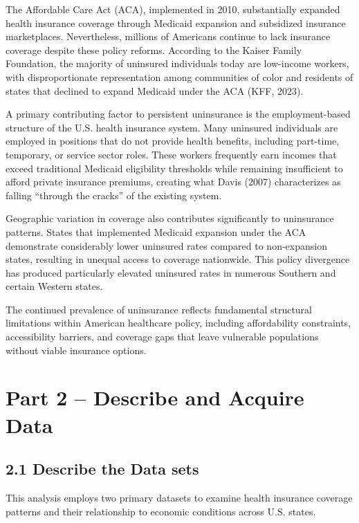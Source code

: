 \documentclass[
]{article}
\begin{document}
The Affordable Care Act (ACA), implemented in 2010, substantially
expanded health insurance coverage through Medicaid expansion and
subsidized insurance marketplaces. Nevertheless, millions of Americans
continue to lack insurance coverage despite these policy reforms.
According to the Kaiser Family Foundation, the majority of uninsured
individuals today are low-income workers, with disproportionate
representation among communities of color and residents of states that
declined to expand Medicaid under the ACA (KFF, 2023).

A primary contributing factor to persistent uninsurance is the
employment-based structure of the U.S. health insurance system. Many
uninsured individuals are employed in positions that do not provide
health benefits, including part-time, temporary, or service sector
roles. These workers frequently earn incomes that exceed traditional
Medicaid eligibility thresholds while remaining insufficient to afford
private insurance premiums, creating what Davis (2007) characterizes as
falling ``through the cracks'' of the existing system.

Geographic variation in coverage also contributes significantly to
uninsurance patterns. States that implemented Medicaid expansion under
the ACA demonstrate considerably lower uninsured rates compared to
non-expansion states, resulting in unequal access to coverage
nationwide. This policy divergence has produced particularly elevated
uninsured rates in numerous Southern and certain Western states.

The continued prevalence of uninsurance reflects fundamental structural
limitations within American healthcare policy, including affordability
constraints, accessibility barriers, and coverage gaps that leave
vulnerable populations without viable insurance options.

\section{Part 2 -- Describe and Acquire
Data}\label{part-2-describe-and-acquire-data}

\subsection{2.1 Describe the Data sets}\label{describe-the-data-sets}

This analysis employs two primary datasets to examine health insurance
coverage patterns and their relationship to economic conditions across
U.S. states.
\end{document}
